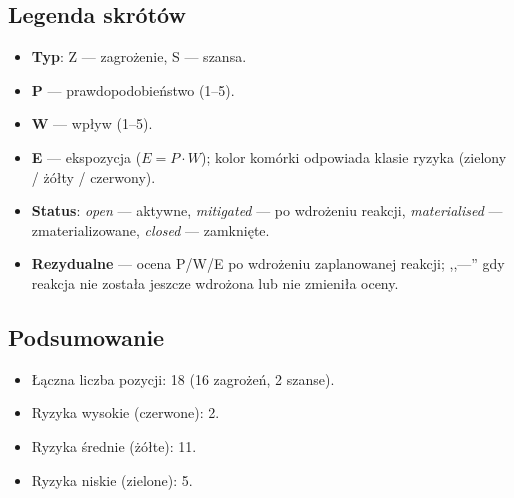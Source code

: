 \documentclass[11pt,a4paper]{article}
\begin{document}
	\subsection*{Legenda skrótów}
	\begin{itemize}[noitemsep]
		\item \textbf{Typ}: Z --- zagrożenie, S --- szansa.
		\item \textbf{P} --- prawdopodobieństwo (1--5).
		\item \textbf{W} --- wpływ (1--5).
		\item \textbf{E} --- ekspozycja ($E = P \cdot W$); kolor komórki odpowiada klasie ryzyka (zielony / żółty / czerwony).
		\item \textbf{Status}: \textit{open} --- aktywne, \textit{mitigated} --- po wdrożeniu reakcji, \textit{materialised} --- zmaterializowane, \textit{closed} --- zamknięte.
		\item \textbf{Rezydualne} --- ocena P/W/E po wdrożeniu zaplanowanej reakcji; ,,---'' gdy reakcja nie została jeszcze wdrożona lub nie zmieniła oceny.
	\end{itemize}
	
	\subsection*{Podsumowanie}
	\begin{itemize}[noitemsep]
		\item Łączna liczba pozycji: 18 (16 zagrożeń, 2 szanse).
		\item Ryzyka wysokie (czerwone): 2.
		\item Ryzyka średnie (żółte): 11.
		\item Ryzyka niskie (zielone): 5.
	\end{itemize}
	
	\clearpage

\pdfpagewidth=60cm
\pdfpageheight=40cm
\paperwidth=60cm
\paperheight=40cm

\setlength{\headwidth}{\textwidth}
\end{document}
